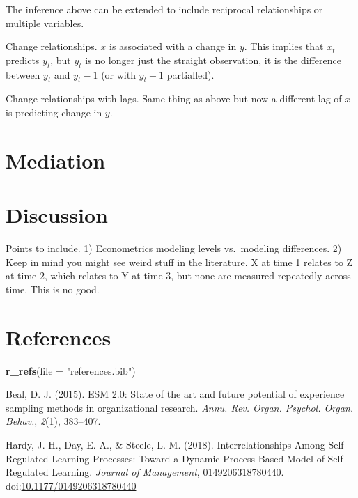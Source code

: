 \documentclass[english,,man]{apa6}
\newenvironment{Shaded}{\begin{snugshade}}{\end{snugshade}}
\newcommand{\DataTypeTok}[1]{\textcolor[rgb]{0.13,0.29,0.53}{#1}}
\newcommand{\KeywordTok}[1]{\textcolor[rgb]{0.13,0.29,0.53}{\textbf{#1}}}
\newcommand{\NormalTok}[1]{#1}
\newcommand{\StringTok}[1]{\textcolor[rgb]{0.31,0.60,0.02}{#1}}
\theoremstyle{definition}
\theoremstyle{definition}
\theoremstyle{definition}
\theoremstyle{remark}
\begin{document}
The inference above can be extended to include reciprocal relationships
or multiple variables.

Change relationships. \(x\) is associated with a change in \(y\). This
implies that \(x_t\) predicts \(y_t\), but \(y_t\) is no longer just the
straight observation, it is the difference between \(y_t\) and \(y_t-1\)
(or with \(y_t-1\) partialled).

Change relationships with lags. Same thing as above but now a different
lag of \(x\) is predicting change in \(y\).

\hypertarget{mediation}{%
\section{Mediation}\label{mediation}}

\hypertarget{discussion}{%
\section{Discussion}\label{discussion}}

Points to include. 1) Econometrics modeling levels vs.~modeling
differences. 2) Keep in mind you might see weird stuff in the
literature. X at time 1 relates to Z at time 2, which relates to Y at
time 3, but none are measured repeatedly across time. This is no good.

\newpage

\hypertarget{references}{%
\section{References}\label{references}}

\begin{Shaded}
\begin{Highlighting}[]
\KeywordTok{r_refs}\NormalTok{(}\DataTypeTok{file =} \StringTok{"references.bib"}\NormalTok{)}
\end{Highlighting}
\end{Shaded}

\setlength{\parindent}{-0.5in}
\setlength{\leftskip}{0.5in}

\hypertarget{refs}{}
\leavevmode\hypertarget{ref-beal_esm_2015}{}%
Beal, D. J. (2015). ESM 2.0: State of the art and future potential of
experience sampling methods in organizational research. \emph{Annu. Rev.
Organ. Psychol. Organ. Behav.}, \emph{2}(1), 383--407.

\leavevmode\hypertarget{ref-hardy_interrelationships_2018}{}%
Hardy, J. H., Day, E. A., \& Steele, L. M. (2018). Interrelationships
Among Self-Regulated Learning Processes: Toward a Dynamic Process-Based
Model of Self-Regulated Learning. \emph{Journal of Management},
0149206318780440.
doi:\href{https://doi.org/10.1177/0149206318780440}{10.1177/0149206318780440}
\end{document}
